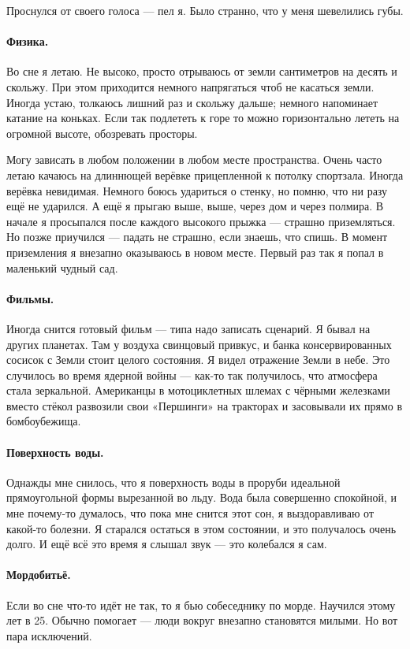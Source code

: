 \documentclass{book}
\begin{document}
Проснулся от своего голоса --- пел я.
Было странно, что у меня шевелились губы.

\paragraph{Физика.}
Во сне я летаю.
Не высоко, просто отрываюсь от земли сантиметров на десять и скольжу.
При этом приходится немного напрягаться чтоб не касаться земли.
Иногда устаю, толкаюсь лишний раз и скольжу дальше; немного напоминает катание на коньках.
Если так подлететь к горе то можно горизонтально лететь на огромной высоте,
обозревать просторы.

Могу зависать в любом положении в любом месте пространства.
Очень часто летаю качаюсь на длиннющей верёвке прицепленной к потолку спортзала.
Иногда верёвка невидимая.
Немного боюсь удариться о стенку, но помню, что ни разу ещё не ударился.
А ещё я прыгаю выше, выше, через дом и через полмира.
В начале я просыпался после каждого высокого прыжка --- страшно приземляться.
Но позже приучился --- падать не страшно, если знаешь, что спишь.
В момент приземления я внезапно оказываюсь в новом месте.
Первый раз так я попал в маленький чудный сад.

\paragraph{Фильмы.}
Иногда снится готовый фильм --- типа надо записать сценарий.
Я бывал на других планетах.
Там у воздуха свинцовый привкус, и банка консервированных сосисок с Земли стоит целого состояния.
Я видел отражение Земли в небе.
Это случилось во время ядерной войны --- как-то так получилось, что атмосфера стала зеркальной.
Американцы в мотоциклетных шлемах с чёрными железками вместо стёкол развозили свои «Першинги» на тракторах и засовывали их прямо в бомбоубежища.

\paragraph{Поверхность воды.}
Однажды мне снилось, что я поверхность воды в проруби идеальной прямоугольной формы вырезанной во льду.
Вода была совершенно спокойной, и мне почему-то думалось, что пока мне снится этот сон, я выздоравливаю от какой-то болезни.
Я старался остаться в этом состоянии, и это получалось очень долго.
И ещё всё это время я слышал звук --- это колебался я сам.

\paragraph{Мордобитьё.}
Если во сне что-то идёт не так, то я бью собеседнику по морде.
Научился этому лет в 25.
Обычно помогает --- люди вокруг внезапно становятся милыми.
Но вот пара исключений. 
\end{document}
